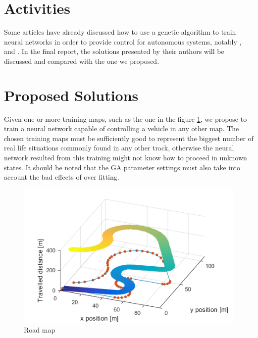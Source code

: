 %
%



\section{Activities}

Some articles have already discussed how to use a genetic algorithm to train neural networks in order to provide control for autonomous systems, notably \cite{8102147}, \cite {SALOMON1997199} and \cite {6146976}. In the final report, the solutions presented by their authors will be discussed and compared with the one we proposed.



\section{Proposed Solutions}

Given one or more training maps, such as the one in the figure \ref{fig:roadMap}, we propose to train a neural network capable of controlling a vehicle in any other map. The chosen training maps must be sufficiently good to represent the biggest number of real life situations commonly found in any other track, otherwise the neural network resulted from this training might not know how to proceed in unknown states. It should be noted that the GA parameter settings must also take into account the bad effects of over fitting. 

\begin{figure}
    \centering
    \includegraphics[width=0.89\columnwidth]{roadMap.png}
    \caption{Road map}
    \label{fig:roadMap}
\end{figure}

